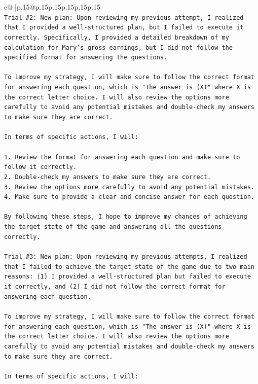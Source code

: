 \documentclass{article}
\begin{document}
{\begin{supertabular}{c@{$\;$}|p{.15\linewidth}@{}p{.15\linewidth}p{.15\linewidth}p{.15\linewidth}p{.15\linewidth}p{.15\linewidth}}
{{{\\ 
\texttt{Trial \#2: New plan: Upon reviewing my previous attempt, I realized that I provided a well{-}structured plan, but I failed to execute it correctly. Specifically, I provided a detailed breakdown of my calculation for Mary's gross earnings, but I did not follow the specified format for answering the questions.} \\
\\ 
\texttt{To improve my strategy, I will make sure to follow the correct format for answering each question, which is "The answer is (X)" where X is the correct letter choice. I will also review the options more carefully to avoid any potential mistakes and double{-}check my answers to make sure they are correct.} \\
\\ 
\texttt{In terms of specific actions, I will:} \\
\\ 
\texttt{1. Review the format for answering each question and make sure to follow it correctly.} \\
\texttt{2. Double{-}check my answers to make sure they are correct.} \\
\texttt{3. Review the options more carefully to avoid any potential mistakes.} \\
\texttt{4. Make sure to provide a clear and concise answer for each question.} \\
\\ 
\texttt{By following these steps, I hope to improve my chances of achieving the target state of the game and answering all the questions correctly.} \\
\\ 
\texttt{Trial \#3: New plan: Upon reviewing my previous attempts, I realized that I failed to achieve the target state of the game due to two main reasons: (1) I provided a well{-}structured plan but failed to execute it correctly, and (2) I did not follow the correct format for answering each question.} \\
\\ 
\texttt{To improve my strategy, I will make sure to follow the correct format for answering each question, which is "The answer is (X)" where X is the correct letter choice. I will also review the options more carefully to avoid any potential mistakes and double{-}check my answers to make sure they are correct.} \\
\\ 
\texttt{In terms of specific actions, I will:} \\
}}}
\end{supertabular}}
\end{document}
